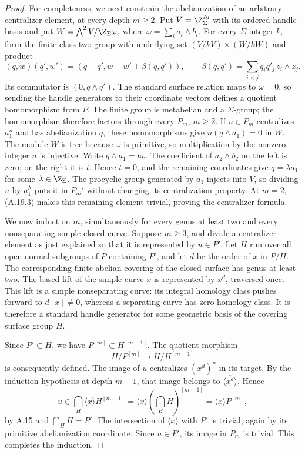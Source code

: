 \begin{proof}
For completeness, we next constrain the abelianization of an arbitrary centralizer element, at every depth $m\ge2$. Put $V=\Z_\Sigma^{2g}$ with its ordered handle basis and put $W=\bigwedge^2V/\Z_\Sigma\omega$, where $\omega=\sum_i a_i\wedge b_i$. For every $\Sigma$-integer $k$, form the finite class-two group with underlying set $(V/kV)\times(W/kW)$ and product
\[
 (q,w)(q',w')=(q+q',w+w'+\beta(q,q')),
 \qquad
 \beta(q,q')=\sum_{i<j}q_iq'_j\,z_i\wedge z_j.
\]
Its commutator is $(0,q\wedge q')$. The standard surface relation maps to $\omega=0$, so sending the handle generators to their coordinate vectors defines a quotient homomorphism from $P$. The finite group is metabelian and a $\Sigma$-group; the homomorphism therefore factors through every $P_m$, $m\ge2$. If $u\in P_m$ centralizes $a_1^n$ and has abelianization $q$, these homomorphisms give
$n(q\wedge a_1)=0$ in $W$. The module $W$ is free because $\omega$ is primitive, so multiplication by the nonzero integer $n$ is injective. Write $q\wedge a_1=t\omega$. The coefficient of $a_2\wedge b_2$ on the left is zero; on the right it is $t$. Hence $t=0$, and the remaining coordinates give $q=\lambda a_1$ for some $\lambda\in\Z_\Sigma$. The procyclic group generated by $a_1$ injects into $V$, so dividing $u$ by $a_1^\lambda$ puts it in $P_m'$ without changing its centralization property. At $m=2$, (A.19.3) makes this remaining element trivial, proving the centralizer formula.

We now induct on $m$, simultaneously for every genus at least two and every nonseparating simple closed curve. Suppose $m\ge3$, and divide a centralizer element as just explained so that it is represented by $u\in P'$. Let $H$ run over all open normal subgroups of $P$ containing $P'$, and let $d$ be the order of $x$ in $P/H$. The corresponding finite abelian covering of the closed surface has genus at least two. The based lift of the simple curve $x$ is represented by $x^d$, traversed once. This lift is a simple nonseparating curve: its integral homology class pushes forward to $d[x]\ne0$, whereas a separating curve has zero homology class. It is therefore a standard handle generator for some geometric basis of the covering surface group $H$.

Since $P'\subset H$, we have $P^{[m]}\subset H^{[m-1]}$. The quotient morphism
\[
 H/P^{[m]}\longrightarrow H/H^{[m-1]}
\]
is consequently defined. The image of $u$ centralizes $(x^d)^n$ in its target. By the induction hypothesis at depth $m-1$, that image belongs to $\overline{\langle x^d\rangle}$. Hence
\[
 u\in\bigcap_H\overline{\langle x\rangle}H^{[m-1]}
 =\overline{\langle x\rangle}\left(\bigcap_HH\right)^{[m-1]}
 =\overline{\langle x\rangle}P^{[m]},
\]
by A.15 and $\bigcap_HH=P'$. The intersection of $\overline{\langle x\rangle}$ with $P'$ is trivial, again by its primitive abelianization coordinate. Since $u\in P'$, its image in $P_m$ is trivial. This completes the induction.


\end{proof}
